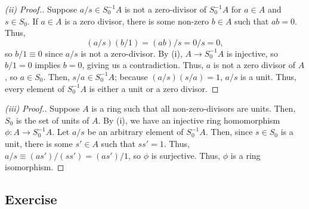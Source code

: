 \begin{proof}[(ii) Proof.]
Suppose $a/s \in S_0^{-1}A$ is not a zero-divisor of $S_0^{-1}A$ for $a \in A$ and $s \in S_0$. If $a \in A$ is a zero divisor, there is some non-zero $b \in A$ such that $ab = 0$. Thus,
$$(a/s)(b/1) = (ab)/s = 0/s = 0,$$
so $b/1 \equiv 0$ since $a/s$ is not a zero-divisor. By (i), $A \to S_0^{-1}A$ is injective, so $b/1 = 0$ implies $b = 0$, giving us a contradiction. Thus, $a$ is not a zero divisor of $A$, so $a \in S_0$.
Then, $s/a \in S_0^{-1}A$; because $(a/s)(s/a) = 1$, $a/s$ is a unit. Thus, every element of $S_0^{-1}A$ is either a unit or a zero divisor.
\end{proof}

\begin{proof}[(iii) Proof.]
Suppose $A$ is a ring such that all non-zero-divisors are units. Then, $S_0$ is the set of units of $A$. By (i), we have an injective ring homomorphism $\phi : A \to S_0^{-1}A$. Let $a/s$ be an
arbitrary element of $S_0^{-1}A$. Then, since $s \in S_0$ is a unit, there is some $s' \in A$ such that $ss' = 1$. Thus, $a/s \equiv (as')/(ss') = (as')/1$, so $\phi$ is surjective. Thus, $\phi$
is a ring isomorphism.
\end{proof}

\subsection{Exercise}\label{3.10}

